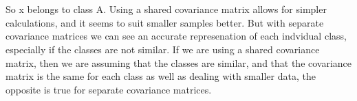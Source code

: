 \documentclass{article}
\begin{document}
\begin{enumerate}[label=\alph*)]
    \\\\So x belongs to class A. Using a shared covariance matrix allows for simpler calculations, and it seems to suit smaller samples better. But with separate
    covariance matrices we can see an accurate represenation of each indvidual class, especially if the classes are not similar. If we are using a shared covariance matrix, then we are assuming that the classes are similar, and that the covariance matrix is the same for each class
    as well as dealing with smaller data, the opposite is true for separate covariance matrices. 
\end{enumerate}
\end{document}
